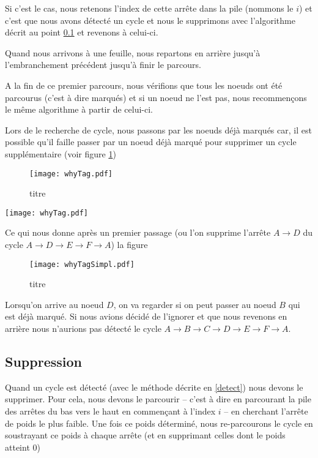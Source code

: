 \documentclass[12pt, oneside]{article}
\begin{document}
Si c'est le cas, nous retenons l'index de cette arrête dans la pile (nommons le $i$) et c'est que nous avons détecté un cycle et nous le supprimons avec l'algorithme décrit au point \ref{del} et revenons à celui-ci.

Quand nous arrivons à une feuille, nous repartons en arrière jusqu'à l'embranchement précédent jusqu'à finir le parcours.

A la fin de ce premier parcours, nous vérifions que tous les noeuds ont été parcourus (c'est à dire marqués) et si un noeud ne l'est pas, nous recommençons le même algorithme à partir de celui-ci.

Lors de le recherche de cycle, nous passons par les noeuds déjà marqués car, il est possible qu'il faille passer par un noeud déjà marqué pour supprimer un cycle supplémentaire (voir figure \ref{whyTag})


\begin{figure}[h]
   \caption{\label{whyTag} titre}
   \begin{center}
   \texttt{[image: whyTag.pdf]}
   \end{center}
\end{figure}
\texttt{[image: whyTag.pdf]}

Ce qui nous donne après un premier passage (ou l'on supprime l'arrête $A \rightarrow D$ du cycle $A \rightarrow D \rightarrow E \rightarrow F \rightarrow A$) la figure %
\begin{figure}[h]
   \caption{\label{whyTagSimpl} titre}
   \texttt{[image: whyTagSimpl.pdf]}
\end{figure}
Lorsqu'on arrive au noeud $D$, on va regarder si on peut passer au noeud $B$ qui est déjà marqué. Si nous avions décidé de l'ignorer et que nous revenons en arrière nous n'aurions pas détecté le cycle $A \rightarrow B \rightarrow C \rightarrow D \rightarrow E \rightarrow F \rightarrow A$.

\subsection{Suppression}
\label{del}

Quand un cycle est détecté (avec le méthode décrite en \ref{detect}) nous devons le supprimer. Pour cela, nous devons le parcourir -- c'est à dire en parcourant la pile des arrêtes du bas vers le haut en commençant à l'index $i$ -- en cherchant l'arrête de poids le plus faible. Une fois ce poids déterminé, nous re-parcourons le cycle en soustrayant ce poids à chaque arrête (et en supprimant celles dont le poids atteint 0)
\end{document}
